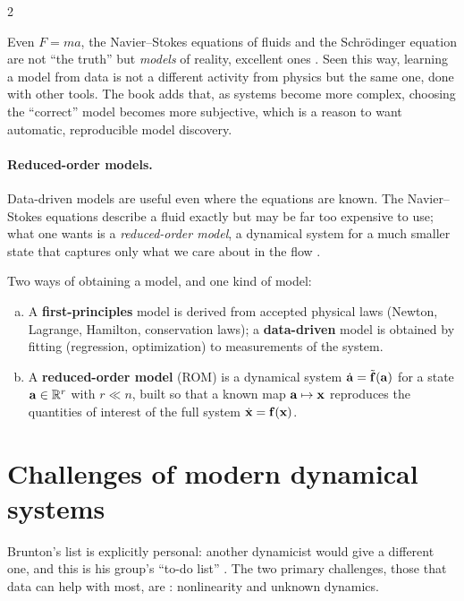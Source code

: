 \begin{paracol}{2}
\begin{remark}
Even $F=ma$, the Navier--Stokes equations of fluids and the Schr\"odinger equation are not ``the
truth'' but \emph{models} of reality, excellent ones . Seen this way, learning a model
from data is not a different activity from physics but the same one, done with other tools. The book
adds that, as systems become more complex, choosing the ``correct'' model becomes more subjective,
which is a reason to want automatic, reproducible model discovery.
\end{remark}

\paragraph{Reduced-order models.} Data-driven models are useful even where the equations are known.
The Navier--Stokes equations describe a fluid exactly but may be far too expensive to use; what one
wants is a \emph{reduced-order model}, a dynamical system for a much smaller state that captures only
what we care about in the flow .

\begin{definition}\label{def:ov-models}
Two ways of obtaining a model, and one kind of model:
\begin{enumerate}[(a)]
  \item A \textbf{first-principles} model is derived from accepted physical laws (Newton, Lagrange,
        Hamilton, conservation laws); a \textbf{data-driven} model is obtained by fitting
        (regression, optimization) to measurements of the system.
  \item A \textbf{reduced-order model} (ROM) is a dynamical system $\dot{\mathbf{a}}=\tilde{\mathbf{f}}(\mathbf{a})$
        for a state $\mathbf{a}\in\mathbb{R}^r$ with $r\ll n$, built so that a known map $\mathbf{a}\mapsto\mathbf{x}$
        reproduces the quantities of interest of the full system $\dot{\mathbf{x}}=\mathbf{f}(\mathbf{x})$.
\end{enumerate}
\end{definition}

\section{Challenges of modern dynamical systems}\label{sec:ov-challenges}

Brunton's list is explicitly personal: another dynamicist would give a different one, and this is his
group's ``to-do list'' . The two primary challenges, those that data can help with most,
are : nonlinearity and unknown dynamics.


\end{paracol}
